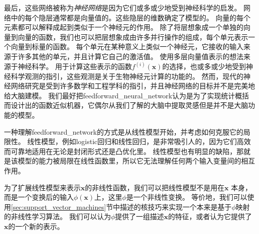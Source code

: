 
最后，这些网络被称为\emph{神经网络}是因为它们或多或少地受到神经科学的启发。
网络中的每个隐层通常都是向量值的。这些隐层的维数确定了模型的。
向量的每个元素都可以解释成起到类似于一个神经元的作用。
除了将层想象成一个单独的向量到向量的函数，我们也可以把层想象成由许多并行操作的组成，每个单元表示一个向量到标量的函数。
每个单元在某种意义上类似一个神经元，它接收的输入来源于许多其他的单元，并且计算它自己的激活值。
使用多层向量值表示的想法来源于神经科学。
用于计算这些表示的函数$f^{(i)}(\bm{x})$的选择，也或多或少地受到神经科学观测的指引，这些观测是关于生物神经元计算的功能的。
然而，现代的神经网络研究是受到许多数学和工程学科的指引，并且神经网络的目标并不是完美地给大脑建模。
我们最好把\gls{feedforward_neural_network}认为是为了实现统计概括而设计出的函数近似机器，它偶尔从我们了解的大脑中提取灵感但是并不是大脑功能的模型。

一种理解\gls{feedforward_network}的方式是从线性模型开始，并考虑如何克服它的局限性。
线性模型，例如logistic回归和线性回归，是非常吸引人的，因为它们高效而可靠地适用在无论是封闭形式还是凸优化里。
线性模型也有明显的缺陷，那就是该模型的能力被局限在线性函数里，所以它无法理解任何两个输入变量间的相互作用。

为了扩展线性模型来表示$\bm{x}$的非线性函数，我们可以把线性模型不是用在$\bm{x}$ 本身，而是一个变换后的输入$\phi(\bm{x})$上，这里$\phi$是一个非线性变换。
等价地，我们可以使用\ref{sec:support_vector_machines}节中描述的核技巧来实现一个本来是基于$\phi$映射的非线性学习算法。
我们可以认为$\phi$提供了一组描述$\bm{x}$的特征，或者认为它提供了$\bm{x}$的一个新的表示。


